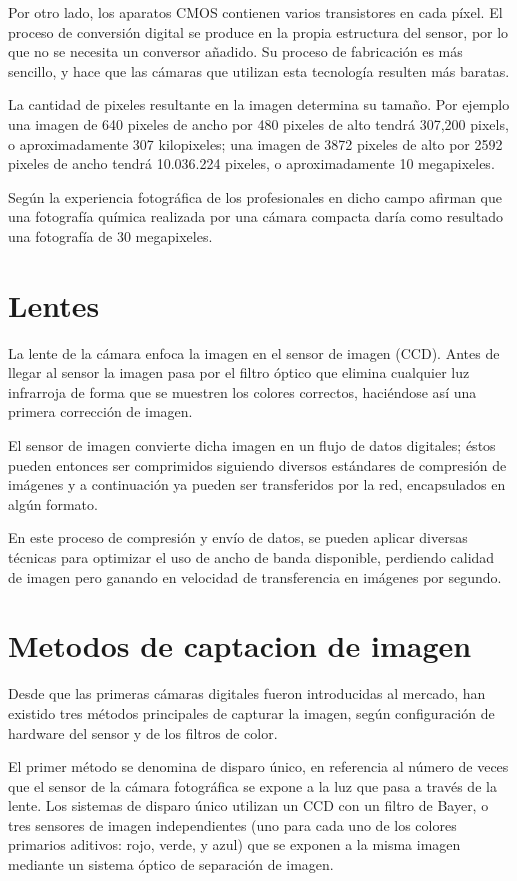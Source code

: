 \documentclass[12pt,a4paper]{report}
\begin{document}
Por otro lado, los aparatos CMOS contienen varios transistores en cada píxel. El proceso de conversión digital se produce en la propia estructura del sensor, por lo que no se necesita un conversor añadido. Su proceso de fabricación es más sencillo, y hace que las cámaras que utilizan esta tecnología resulten más baratas.

La cantidad de pixeles resultante en la imagen determina su tamaño. Por ejemplo una imagen de 640 pixeles de ancho por 480 pixeles de alto tendrá 307,200 pixels, o aproximadamente 307 kilopixeles; una imagen de 3872 pixeles de alto por 2592 pixeles de ancho tendrá 10.036.224 pixeles, o aproximadamente 10 megapixeles.

Según la experiencia fotográfica de los profesionales en dicho campo afirman que una fotografía química realizada por una cámara compacta daría como resultado una fotografía de 30 megapixeles.

\section{Lentes}

La lente de la cámara enfoca la imagen en el sensor de imagen
(CCD). Antes de llegar al sensor la imagen pasa por el filtro óptico que
elimina cualquier luz infrarroja de forma que se muestren los colores
correctos, haciéndose así una primera corrección de imagen.

El sensor de imagen convierte dicha imagen en un flujo de datos
digitales; éstos pueden entonces ser comprimidos siguiendo diversos
estándares de compresión de imágenes y a continuación ya pueden
ser transferidos por la red, encapsulados en algún formato.

En este proceso de compresión y envío de datos, se pueden aplicar
diversas técnicas para optimizar el uso de ancho de banda disponible,
perdiendo calidad de imagen pero ganando en velocidad de
transferencia en imágenes por segundo.

\section{Metodos de captacion de imagen}

Desde que las primeras cámaras digitales fueron introducidas al mercado, han existido tres métodos principales de capturar la imagen, según configuración de hardware del sensor y de los filtros de color.

El primer método se denomina de disparo único, en referencia al número de veces que el sensor de la cámara fotográfica se expone a la luz que pasa a través de la lente. Los sistemas de disparo único utilizan un CCD con un filtro de Bayer, o tres sensores de imagen independientes (uno para cada uno de los colores primarios aditivos: rojo, verde, y azul) que se exponen a la misma imagen mediante un sistema óptico de separación de imagen.
\end{document}
